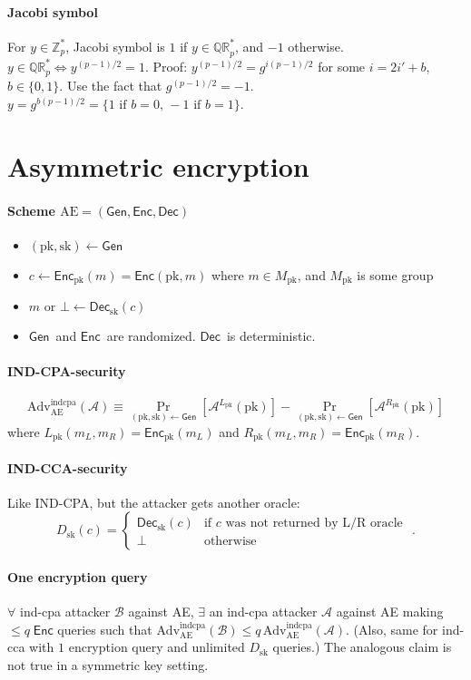 \documentclass[11pt]{article}
\newcommand{\eqdef}{\ensuremath{\equiv}}
\newcommand{\Gen}{\ensuremath{\mathsf{Gen}}}
\newcommand{\Enc}{\ensuremath{\mathsf{Enc}}}
\newcommand{\Dec}{\ensuremath{\mathsf{Dec}}}
\newcommand{\ZZ}{\ensuremath{\mathds{Z}}}
\newcommand{\QR}{\ensuremath{\mathds{QR}}}
\newcommand{\pk}{\text{pk}}
\newcommand{\sk}{\text{sk}}
\renewcommand{\AE}{\text{AE}}
\newcommand{\Adv}{\text{Adv}}
\newcommand{\indcpa}{\text{indcpa}}
\theoremstyle{remark}
\begin{document}
\paragraph{Jacobi symbol} For $y\in\ZZ_p^*$, Jacobi symbol is
$1$ if $y\in\QR_p^*$, and $-1$ otherwise.
$y\in\QR_p^*\iff y^{(p-1)/2}=1$.
Proof:
$y^{(p-1)/2}=g^{i(p-1)/2}$ for some $i=2i'+b$, $b\in\{0,1\}$.
Use the fact that $g^{(p-1)/2}=-1$.
$y=g^{b(p-1)/2} = \{ 1 \text{ if } b=0\text{, } -1\text{ if } b=1 \}$.

\section{Asymmetric encryption}

\paragraph{Scheme $\AE=(\Gen,\Enc,\Dec)$}
\begin{itemize}
\item $(\pk,\sk)\gets\Gen$
\item $c\gets\Enc_\pk(m)=\Enc(\pk,m)$ where
      $m\in M_\pk$, and $M_\pk$ is some group
\item $m\text{ or }\bot\gets\Dec_\sk(c)$
\item \Gen\ and \Enc\ are randomized. \Dec\ is deterministic.
\end{itemize}

\paragraph{IND-CPA-security}
\[\Adv_\AE^\indcpa(\mathcal{A})\eqdef
\Pr_{(\pk,\sk)\gets\Gen}\left[\mathcal{A}^{L_\pk}(\pk)\right] -
\Pr_{(\pk,\sk)\gets\Gen}\left[\mathcal{A}^{R_\pk}(\pk)\right]
\] where $L_\pk(m_L,m_R)=\Enc_\pk(m_L)$
and $R_\pk(m_L,m_R)=\Enc_\pk(m_R)$.

\paragraph{IND-CCA-security}
Like IND-CPA, but the attacker gets another oracle:
\[ D_\sk(c)=\begin{cases}
\Dec_\sk(c)&\text{if $c$ was not returned by L/R oracle}\\
\bot&\text{otherwise}
\end{cases}\text{ .} \]

\paragraph{One encryption query}
$\forall$ ind-cpa attacker $\mathcal{B}$ against AE,
$\exists$ an ind-cpa attacker $\mathcal{A}$ against AE
making $\le q\; \Enc$ queries
such that $\Adv_\AE^\indcpa(\mathcal{B}) \le q\,\Adv_\AE^\indcpa(\mathcal{A})$.
(Also, same for ind-cca with $1$ encryption query and unlimited $D_\sk$ queries.)
The analogous claim is not true in a symmetric key setting.
\end{document}
